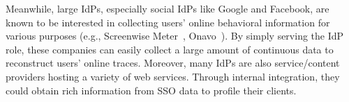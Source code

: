 



Meanwhile, large IdPs, especially social IdPs like Google and Facebook, are known to be interested in collecting users' online behavioral information for various purposes (e.g., Screenwise Meter~\cite{googlenews}, Onavo~\cite{Onavo}). By simply serving the IdP role, these companies can easily collect a large amount of continuous data to reconstruct users' online traces. %
Moreover, many IdPs are also service/content providers hosting a variety of web services. Through internal integration, they could obtain rich information from SSO data to profile their clients.

